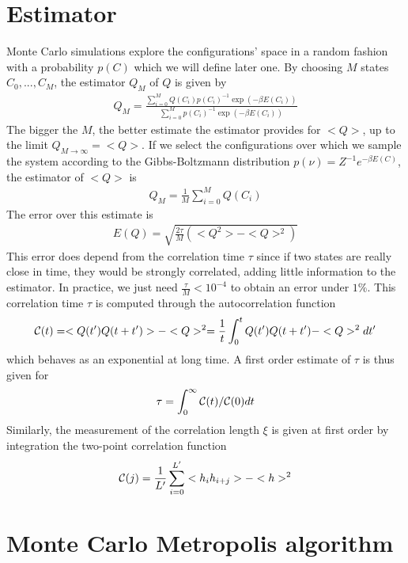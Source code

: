     \section{Estimator}

Monte Carlo simulations explore the configurations' space in a random fashion \cite{newman_monte_1999} with a probability $p(C)$ which we will define later one. By choosing $M$ states ${C_0,...,C_M}$, the estimator $Q_M$ of $Q$ is given by
\begin{align}
    Q_M = \frac{\sum_{i=0}^M Q(C_i) p(C_i)^{-1} \exp(-\beta E(C_i))}{\sum_{i=0}^M  p(C_i)^{-1} \exp(-\beta E(C_i))}
\end{align}
The bigger the $M$, the better estimate the estimator provides for $<Q>$, up to the limit $Q_{M\to \infty} = <Q>$. If we select the configurations over which we sample the system according to the Gibbs-Boltzmann distribution $p(\nu) = Z^{-1} e^{-\beta E(C)}$, the estimator of $<Q>$ is
\begin{align}
    Q_M = \frac{1}{M} \sum_{i=0}^M Q(C_i)
\end{align}
The error over this estimate is
\begin{align}
	E(Q) = \sqrt{\frac{2 \tau}{M} (<Q^2>-<Q>^2)} 
\end{align}
This error does depend from the correlation time $\tau$ since if two states are really close in time, they would be strongly correlated, adding little information to the estimator. In practice, we just need $\frac{\tau}{M} \less 10^{-4}$ to obtain an error under $1\%$. This correlation time $\tau$ is computed through the autocorrelation function
\begin{align}
    \mathcal{C}(t) = <Q(t')Q(t+t')>- <Q>^2 = \frac{1}{t}\int_0^t Q(t')Q(t+t')-<Q>^2 dt' 
\end{align}
which behaves as an exponential at long time\cite{wansleben_monte_1991}. A first order estimate of $\tau$ is thus given for
\begin{align}
	\tau = \int_0^{\infty} \mathcal{C}(t)/\mathcal{C}(0) dt
	\label{tau_cor}
\end{align}
Similarly, the measurement of the correlation length $\xi$ is given at first order by integration the two-point correlation function
\begin{align}
\mathcal{C}(j) = \frac{1}{L'} \sum_{i=0}^{L'} <h_i h_{i+j}>-<h>^2 
\end{align}

    \section{Monte Carlo Metropolis algorithm}

